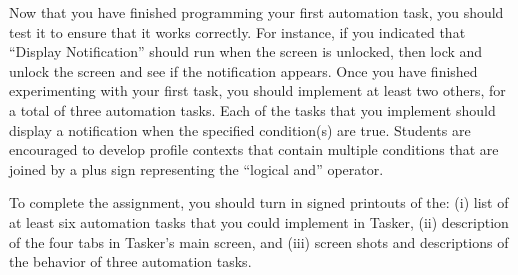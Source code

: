Now that you have finished programming your first automation task, you should test it to ensure that it works correctly.
For instance, if you indicated that ``Display Notification'' should run when the screen is unlocked, then lock and
unlock the screen and see if the notification appears.  Once you have finished experimenting with your first task, you
should implement at least two others, for a total of three automation tasks. Each of the tasks that you implement should
display a notification when the specified condition(s) are true.  Students are encouraged to develop profile contexts that
contain multiple conditions that are joined by a plus sign representing the ``logical and'' operator. 


To complete the assignment, you should turn in signed printouts of the: (i) list of at least six automation tasks
that you could implement in Tasker, (ii) description of the four tabs in Tasker's main screen, and (iii) screen shots
and descriptions of the behavior of three automation tasks.


